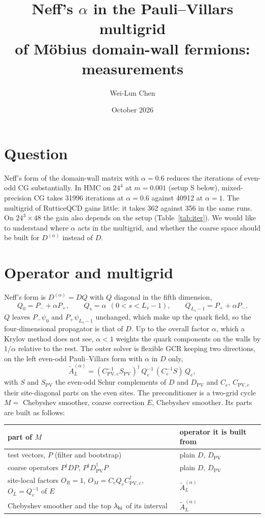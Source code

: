 \documentclass[11pt,a4paper]{article}
\title{Neff's \texorpdfstring{$\alpha$}{alpha} in the Pauli--Villars multigrid\texorpdfstring{\\}{ }of M\"obius domain-wall fermions: measurements}
\author{Wei-Lun Chen}
\date{October 2026}
\newcommand{\Dpv}{D_{\mathrm{PV}}}
\newcommand{\Pp}{P_{+}}
\newcommand{\Pm}{P_{-}}
\newcommand{\AL}{\tilde A_{L}}
\newcommand{\Ce}{C_{e}}
\newcommand{\Cpve}{C_{\mathrm{PV},e}}
\newcommand{\Spv}{S_{\mathrm{PV}}}
\newcommand{\dg}{^{\dagger}}
\begin{document}
\maketitle

\section{Question}
Neff's form of the domain-wall matrix with $\alpha=0.6$ reduces the iterations of
even-odd CG substantially. In HMC on $24^4$ at $m=0.001$ (setup S below), mixed-precision CG
takes 31996 iterations at $\alpha=0.6$ against 40912 at $\alpha=1$. The multigrid of
RutticeQCD gains little: it takes 362 against 356 in the same runs. On $24^3\times48$ the gain
also depends on the setup (Table~\ref{tab:iter}). We would like to understand where $\alpha$
acts in the multigrid, and whether the coarse space should be built for $D^{(\alpha)}$
instead of $D$.

\section{Operator and multigrid}
Neff's form is $D^{(\alpha)}=DQ$ with $Q$ diagonal in the fifth dimension,
\begin{equation}
Q_0=\Pm+\alpha\Pp,\qquad Q_s=\alpha\ \ (0<s<L_s-1),\qquad Q_{L_s-1}=\Pp+\alpha\Pm .
\end{equation}
$Q$ leaves $\Pm\psi_0$ and $\Pp\psi_{L_s-1}$ unchanged, which make up the quark field, so the
four-dimensional propagator is that of $D$. Up to the overall factor $\alpha$, which a Krylov
method does not see, $\alpha<1$ weights the quark components on the walls by $1/\alpha$
relative to the rest. The outer solver is flexible GCR keeping two directions, on the left
even-odd Pauli--Villars form with $\alpha$ in $D$ only,
\begin{equation}
\AL^{(\alpha)}=(\Cpve^{-1}\Spv)\dg\,Q_e^{-1}\,(\Ce^{-1}S)\,Q_e ,
\end{equation}
with $S$ and $\Spv$ the even-odd Schur complements of $D$ and $\Dpv$ and $\Ce$, $\Cpve$ their
site-diagonal parts on the even sites. The preconditioner is a two-grid cycle
$M=$ Chebyshev smoother, coarse correction $E$, Chebyshev smoother. Its parts are built as
follows:

\begin{center}
\begin{tabular}{@{}ll@{}}
\toprule
part of $M$ & operator it is built from\\
\midrule
test vectors, $P$ (filter and bootstrap) & plain $D$, $\Dpv$\\
coarse operators $P\dg DP$, $P\dg\Dpv\dg P$ & plain $D$, $\Dpv$\\
site-local factors $O_R=1$, $O_M=\Ce Q_e\Cpve\dg$, $O_L=Q_e^{-1}$ of $E$ & $\AL^{(\alpha)}$\\
Chebyshev smoother and the top $\lambda_{\rm hi}$ of its interval & $\AL^{(\alpha)}$\\
\bottomrule
\end{tabular}
\end{center}
\end{document}
